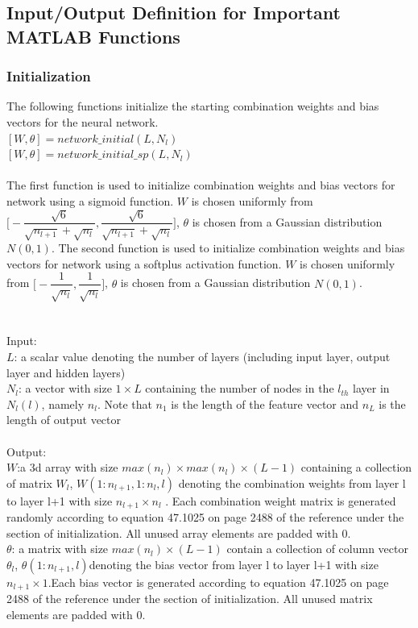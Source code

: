 \documentclass[journal,a4paper,onecolumn,11pt]{IEEEtran}
\begin{document}
\pagebreak
\appendix
{}
\renewcommand{\thesubsection}{\Alph{subsection}}

\subsection{Input/Output Definition for Important MATLAB Functions}

\subsubsection{Initialization}
The following functions initialize the starting combination weights and bias vectors for the neural network.\\
$[W,\theta] = network\_initial(L,N_{l})$\\
$[W,\theta] = network\_initial\_sp(L,N_{l})$\\\\
The first function is used to initialize combination weights and bias vectors for network using a sigmoid function. $W$ is chosen uniformly from $\bigg[-\dfrac{\sqrt{6}}{\sqrt{n_{l+1}}+\sqrt{n_l}},\dfrac{\sqrt{6}}{\sqrt{n_{l+1}}+\sqrt{n_l}}\bigg]$, $\theta$ is chosen from a Gaussian distribution $N(0,1)$.   The second function  is used to initialize combination weights and bias vectors for network using a softplus activation function. $W$ is chosen uniformly from $\bigg[-\dfrac{1}{\sqrt{n_l}},\dfrac{1}{\sqrt{n_l}}\bigg]$, $\theta$ is chosen from a Gaussian distribution $N(0,1)$.\\\\\\
Input:\\
$L$:  a scalar value denoting the number of layers (including input layer, output layer and hidden layers)\\
$N_{l}$: a vector with size  $1\times L$ containing the number of nodes in the $l_{th}$ layer in $N_{l}(l)$, namely  $n_{l}$. Note that $n_1$ is the length of the feature vector and $n_L$ is the length of output vector \\ \\
Output:\\
$W$:a 3d array with size $max(n_{l})\times max(n_{l}) \times (L-1)$ containing a collection of matrix $W_{l}$, $W(1:n_{l+1},1:n_{l},l)$ denoting the combination weights from layer l to layer l+1 with size $n_{l+1} \times n_{l}$ . Each combination weight matrix is generated randomly according to equation 47.1025 on page 2488 of the reference under the section of initialization. All unused array elements are padded with 0. \\
$\theta$: a matrix with size $max(n_{l}) \times (L-1)$ contain a collection of column vector $\theta_{l}$, $\theta(1:n_{l+1},l)$denoting the bias vector from layer l to layer l+1 with size $n_{l+1} \times 1$.Each bias vector is generated according to equation 47.1025 on page 2488 of the reference under the section of initialization. All unused matrix elements are padded with 0. \\ 
\pagebreak
\end{document}
